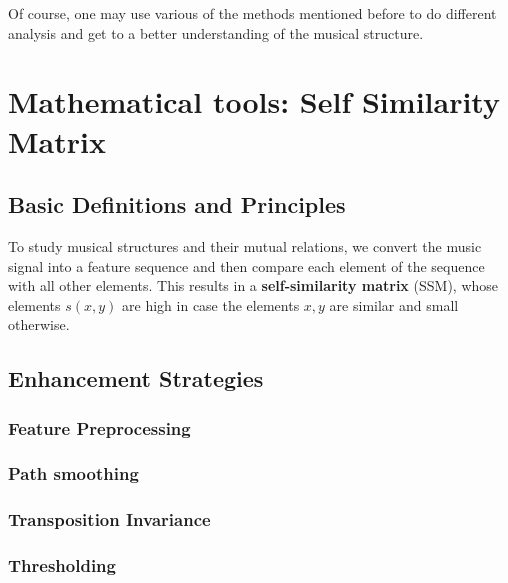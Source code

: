 \documentclass[a4paper, 9pt, twocolumn]{extarticle}
\begin{document}
Of course, one may use various of the methods mentioned before to do different analysis and get to a better understanding of the musical structure.

\section{Mathematical tools: Self Similarity Matrix}
\label{section:ssm}
\subsection{Basic Definitions and Principles}
\label{subsection:ssmBasic}

To study musical structures and their mutual relations, we convert the music signal into a feature sequence and then compare each element of the sequence with all other elements. This results in a \textbf{self-similarity matrix} (SSM), whose elements $s(x,y)$ are high in case the elements $x,y$ are similar and small otherwise. 

\subsection{Enhancement Strategies}
\label{subsection:ssmEnhancement}



\subsubsection{Feature Preprocessing}
\label{subsubsection:ssmEnhancementFeaturePreprocessing}

\subsubsection{Path smoothing}
\label{subsubsection:ssmEnhancementPathSmoothing}


\subsubsection{Transposition Invariance}
\label{subsubsection:ssmEnhancementTransInvariance}


\subsubsection{Thresholding}
\label{subsubsection:ssmEnhancementThresholding}
\end{document}
